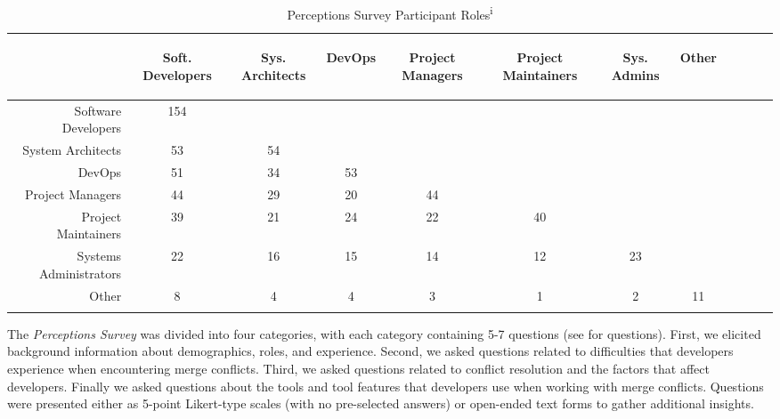 \begin{table}[!htbp]
\caption{Perceptions Survey Participant Roles\textsuperscript{i}}
\label{survey_roles}
\centering
\begin{tabularx}{\textwidth}{@{}r|*{10}{C}c@{}}
\toprule
\addlinespace[4.5em]
	& \begin{rotate}{30} Soft. Developers \end{rotate} 
	& \begin{rotate}{30} Sys. Architects \end{rotate} 
	& \begin{rotate}{30} DevOps \end{rotate} 
	& \begin{rotate}{30} Project Managers \end{rotate}
	& \begin{rotate}{30} Project Maintainers \end{rotate}
	& \begin{rotate}{30} Sys. Admins \end{rotate}
	& \begin{rotate}{30} Other \end{rotate}\\
\midrule
	Software Developers & 154 & & & & & & \\
	System Architects & 53 & 54 & & & & & \\
	DevOps & 51 & 34 & 53 & & & & \\
	Project Managers & 44 & 29 & 20 & 44 & & & \\
	Project Maintainers & 39 & 21 & 24 & 22 & 40 & & \\
	Systems Administrators & 22 & 16 & 15 & 14 & 12 & 23 & \\
	Other & 8 & 4 & 4 & 3 & 1 & 2 & 11 \\
\bottomrule
\end{tabularx}
\end{table}

The \textit{Perceptions Survey} was divided into four categories, with each category containing 5-7 questions (see \cite{companion_site} for questions).
First, we elicited background information about demographics, roles, and experience.
Second, we asked questions related to difficulties that developers experience when encountering merge conflicts.
Third, we asked questions related to conflict resolution and the factors that affect developers.
Finally we asked questions about the tools and tool features that developers use when working with merge conflicts.
Questions were presented either as 5-point Likert-type scales (with no pre-selected answers) or open-ended text forms to gather additional insights.

